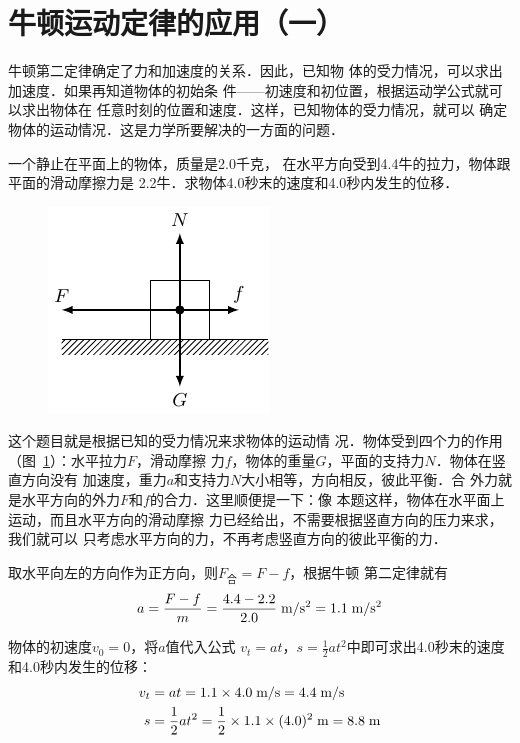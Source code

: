\section{牛顿运动定律的应用（一）}
    牛顿第二定律确定了力和加速度的关系．因此，已知物
体的受力情况，可以求出加速度．如果再知道物体的初始条
件——初速度和初位置，根据运动学公式就可以求出物体在
任意时刻的位置和速度．这样，已知物体的受力情况，就可以
确定物体的运动情况．这是力学所要解决的一方面的问题．

\begin{example}
一个静止在平面上的物体，质量是2.0千克，
在水平方向受到4.4牛的拉力，物体跟平面的滑动摩擦力是
2.2牛．求物体4.0秒末的速度和4.0秒内发生的位移．
\end{example}

\begin{figure}[htbp]
    \centering
    \includegraphics{fig/A/3-8.pdf}
    \caption{}\label{fig_A_3-8}
\end{figure}

\begin{solution}
这个题目就是根据已知的受力情况来求物体的运动情
况．物体受到四个力的作用（图~\ref{fig_A_3-8}）：水平拉力$F$，滑动摩擦
力$f$，物体的重量$G$，平面的支持力$N$．物体在竖直方向没有
加速度，重力$a$和支持力$N$大小相等，方向相反，彼此平衡．合
外力就是水平方向的外力$F$和$f$的合力．这里顺便提一下：像
本题这样，物体在水平面上运动，而且水平方向的滑动摩擦
力已经给出，不需要根据竖直方向的压力来求，我们就可以
只考虑水平方向的力，不再考虑竖直方向的彼此平衡的力．



    取水平向左的方向作为正方向，则$F_{\text{合}}=F-f$，根据牛顿
第二定律就有
\[a=\frac{F-f}{m}=\frac{4.4-2.2}{2.0}\;\text{m}/\text{s}^2=1.1\;\text{m}/\text{s}^2 \]
 
 物体的初速度$v_0=0$，将$a$值代入公式
$v_t=at $，$  s=\frac{1}{2}at^2$中即可求出4.0秒末的速度和4.0秒内发生的位移：
\[\begin{split}
v_t&=at=1.1\times 4.0\;\text{m}/\text{s} =4.4\;\text{m}/\text{s}\\
s&=\frac{1}{2}at^2=\frac{1}{2}\times 1.1\times (4.0)^2 \;\text{m}=8.8\;\text{m}
\end{split} \]
\end{solution}

